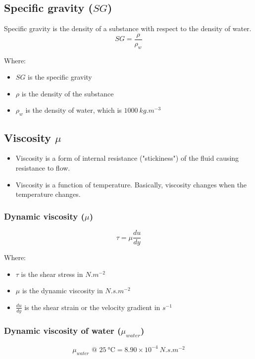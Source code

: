 \documentclass[11pt]{article}
\begin{document}
\subsection{Specific gravity (\(SG\))}
\label{sec:org9ff023d}
Specific gravity is the density of a substance with respect to the density of water.
\[SG = \frac{\rho}{\rho_w}\]

Where:
\begin{itemize}
\item \(SG\) is the specific gravity
\item \(\rho\) is the density of the substance
\item \(\rho_w\) is the density of water, which is \(\qty{1000}{kg.m^{-3}}\)
\end{itemize}

\subsection{Viscosity \(\mu\)}
\label{sec:org89fade6}
\begin{itemize}
\item Viscosity is a form of internal resistance ("stickiness") of the fluid causing resistance to flow.
\item Viscosity is a function of temperature. Basically, viscosity changes when the temperature changes.
\end{itemize}

\subsubsection{Dynamic viscosity (\(\mu\))}
\label{sec:orge82371c}
\[\tau = \mu \frac{du}{dy}\]

Where:
\begin{itemize}
\item \(\tau\) is the shear stress in \(\unit{N.m^{-2}}\)
\item \(\mu\) is the dynamic viscosity in \(\unit{N.s.m^{-2}}\)
\item \(\frac{du}{dy}\) is the shear strain or the velocity gradient in \(\unit{s^{-1}}\)
\end{itemize}

\subsubsection{Dynamic viscosity of water (\(\mu_{water}\))}
\label{sec:org2ec1e57}
\[\mu_{water} \text{ @ } \qty{25}{\degreeCelsius} = 8.90 \times 10^{-4} \ \unit{N.s.m^{-2}}\]
\end{document}

